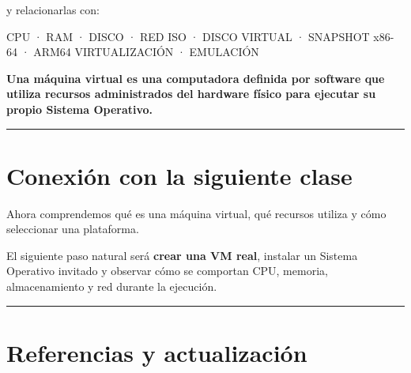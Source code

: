 \documentclass[
  spanish,
  letterpaper,
]{scrbook}
\newenvironment{Shaded}{\begin{snugshade}}{\end{snugshade}}
\newcommand{\NormalTok}[1]{\textcolor[rgb]{0.00,0.23,0.31}{#1}}
\begin{document}
y relacionarlas con:

\begin{Shaded}
\begin{Highlighting}[]
\NormalTok{CPU · RAM · DISCO · RED}
\NormalTok{ISO · DISCO VIRTUAL · SNAPSHOT}
\NormalTok{x86{-}64 · ARM64}
\NormalTok{VIRTUALIZACIÓN · EMULACIÓN}
\end{Highlighting}
\end{Shaded}

\begin{tcolorbox}[enhanced jigsaw, arc=.35mm, bottomrule=.15mm, bottomtitle=1mm, breakable, colback=white, colbacktitle=quarto-callout-note-color!10!white, colframe=quarto-callout-note-color-frame, coltitle=black, left=2mm, leftrule=.75mm, opacityback=0, opacitybacktitle=0.6, rightrule=.15mm, title=\textcolor{quarto-callout-note-color}{\faInfo}\hspace{0.5em}{Síntesis en una frase}, titlerule=0mm, toprule=.15mm, toptitle=1mm]

\textbf{Una máquina virtual es una computadora definida por software que
utiliza recursos administrados del hardware físico para ejecutar su
propio Sistema Operativo.}

\end{tcolorbox}

\begin{center}\rule{0.5\linewidth}{0.5pt}\end{center}


\chapter{Conexión con la siguiente
clase}\label{conexiuxf3n-con-la-siguiente-clase-1}

Ahora comprendemos qué es una máquina virtual, qué recursos utiliza y
cómo seleccionar una plataforma.

El siguiente paso natural será \textbf{crear una VM real}, instalar un
Sistema Operativo invitado y observar cómo se comportan CPU, memoria,
almacenamiento y red durante la ejecución.

\begin{center}\rule{0.5\linewidth}{0.5pt}\end{center}


\chapter{Referencias y
actualización}\label{referencias-y-actualizaciuxf3n-1}
\end{document}
